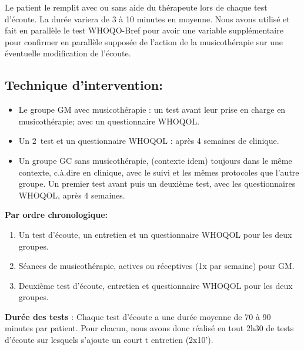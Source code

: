 Le patient le remplit avec ou sans aide du
thérapeute lors de chaque test
d'écoute. La durée variera de 3 à 10 minutes en
moyenne. 
Nous avons utilisé et fait en parallèle le test WHOQO-Bref pour avoir une variable supplémentaire pour confirmer en
parallèle supposée de l'action de la musicothérapie sur une éventuelle modification de l'écoute.


        	
 \subsection{Technique d'intervention:}


       
\begin{itemize}
\item Le groupe GM avec musicothérapie : un
          test avant leur prise en charge en musicothérapie; avec un questionnaire
          WHOQOL.
          
\item Un 2\ieme\ test et un questionnaire WHOQOL : après 4 semaines de
          clinique.
          
\item Un groupe GC sans musicothérapie, (contexte idem)
	toujours dans le même contexte, c.à.dire en clinique, avec le suivi et les mêmes protocoles que l'autre groupe. Un premier test avant
        puis un deuxième test, avec les questionnaires WHOQOL, après 4 semaines.
        
\end{itemize}

\textbf{ Par ordre chronologique:}
 
\begin{enumerate} 
   \item Un test d'écoute, un entretien et un questionnaire
        WHOQOL pour les deux groupes.
    \item Séances de musicothérapie, actives ou réceptives (1x par
        semaine) pour GM.
    \item Deuxième test d'écoute, entretien et questionnaire
      WHOQOL pour les deux groupes.
      
\end{enumerate}

	
	
	\textbf{Durée des tests} : Chaque test d'écoute a une durée  moyenne de
        70 à 90 minutes par patient. Pour chacun, nous avons donc réalisé
        en tout 2h30 de tests d'écoute sur lesquels
        s'ajoute un court 
t        entretien (2x10').

